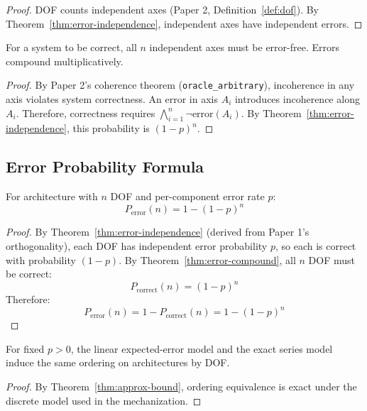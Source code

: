 \begin{proof}
DOF counts independent axes (Paper 2, Definition~\ref{def:dof}). By Theorem~\ref{thm:error-independence}, independent axes have independent errors.
\end{proof}

\begin{theorem}\label{thm:error-compound}
For a system to be correct, all $n$ independent axes must be error-free. Errors compound multiplicatively.
\end{theorem}

\begin{proof}
By Paper 2's coherence theorem (\texttt{oracle\_arbitrary}), incoherence in any axis violates system correctness. An error in axis $A_i$ introduces incoherence along $A_i$. Therefore, correctness requires $\bigwedge_{i=1}^{n} \neg\text{error}(A_i)$. By Theorem~\ref{thm:error-independence}, this probability is $(1-p)^n$.
\end{proof}

\subsection{Error Probability Formula}

\begin{theorem}\label{thm:error-prob}
For architecture with $n$ DOF and per-component error rate $p$:
\[
P_{\text{error}}(n) = 1 - (1-p)^n
\]
\end{theorem}

\begin{proof}
By Theorem~\ref{thm:error-independence} (derived from Paper 1's orthogonality), each DOF has independent error probability $p$, so each is correct with probability $(1-p)$. By Theorem~\ref{thm:error-compound}, all $n$ DOF must be correct:
\[
P_{\text{correct}}(n) = (1-p)^n
\]
Therefore:
\[
P_{\text{error}}(n) = 1 - P_{\text{correct}}(n) = 1 - (1-p)^n
\]
\end{proof}

\begin{corollary}\label{cor:linear-approx}
For fixed $p>0$, the linear expected-error model and the exact series model induce the same ordering on architectures by DOF.
\end{corollary}

\begin{proof}
By Theorem~\ref{thm:approx-bound}, ordering equivalence is exact under the discrete model used in the mechanization.
\end{proof}

